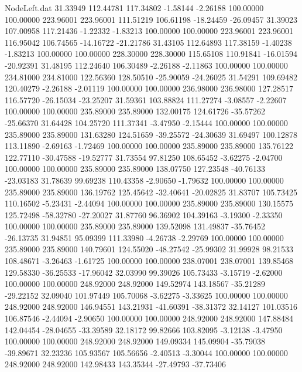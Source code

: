 \begin{filecontents}{NodeLeft.dat}
  31.33949  112.44781  117.34802    -1.58144   -2.26188  100.00000  100.00000  223.96001  223.96001  111.51219  106.61198  -18.24459  -26.09457
  31.39023  107.00958  117.21436    -1.22332   -1.83213  100.00000  100.00000  223.96001  223.96001  116.95042  106.74565  -14.16722  -21.21786
  31.43105  112.64893  117.38159    -1.40238   -1.83213  100.00000  100.00000  228.30000  228.30000  115.65108  110.91841  -16.01594  -20.92391
  31.48195  112.24640  106.30489    -2.26188   -2.11863  100.00000  100.00000  234.81000  234.81000  122.56360  128.50510  -25.90059  -24.26025
  31.54291  109.69482  120.40279    -2.26188   -2.01119  100.00000  100.00000  236.98000  236.98000  127.28517  116.57720  -26.15034  -23.25207
  31.59361  103.88824  111.27274    -3.08557   -2.22607  100.00000  100.00000  235.89000  235.89000  132.00175  124.61726  -35.57262  -25.66370
  31.64428  104.25720  111.37341    -3.47950   -2.15444  100.00000  100.00000  235.89000  235.89000  131.63280  124.51659  -39.25572  -24.30639
  31.69497  100.12878  113.11890    -2.69163   -1.72469  100.00000  100.00000  235.89000  235.89000  135.76122  122.77110  -30.47588  -19.52777
  31.73554   97.81250  108.65452    -3.62275   -2.04700  100.00000  100.00000  235.89000  235.89000  138.07750  127.23548  -40.76133  -23.03183
  31.78639   99.69238  110.43358    -2.90650   -1.79632  100.00000  100.00000  235.89000  235.89000  136.19762  125.45642  -32.40641  -20.02825
  31.83707  105.73425  110.16502    -5.23431   -2.44094  100.00000  100.00000  235.89000  235.89000  130.15575  125.72498  -58.32780  -27.20027
  31.87760   96.36902  104.39163    -3.19300   -2.33350  100.00000  100.00000  235.89000  235.89000  139.52098  131.49837  -35.76452  -26.13735
  31.94851   95.09399  111.33980    -4.26738   -2.29769  100.00000  100.00000  235.89000  235.89000  140.79601  124.55020  -48.27542  -25.99302
  31.99928   98.21533  108.48671    -3.26463   -1.61725  100.00000  100.00000  238.07001  238.07001  139.85468  129.58330  -36.25533  -17.96042
  32.03990   99.39026  105.73433    -3.15719   -2.62000  100.00000  100.00000  248.92000  248.92000  149.52974  143.18567  -35.21289  -29.22152
  32.09040  101.97449  105.70068    -3.62275   -3.33625  100.00000  100.00000  248.92000  248.92000  146.94551  143.21931  -41.60391  -38.31372
  32.14127  101.03516  106.87546    -2.44094   -2.90650  100.00000  100.00000  248.92000  248.92000  147.88484  142.04454  -28.04655  -33.39589
  32.18172   99.82666  103.82095    -3.12138   -3.47950  100.00000  100.00000  248.92000  248.92000  149.09334  145.09904  -35.79038  -39.89671
  32.23236  105.93567  105.56656    -2.40513   -3.30044  100.00000  100.00000  248.92000  248.92000  142.98433  143.35344  -27.49793  -37.73406

\end{filecontents}
